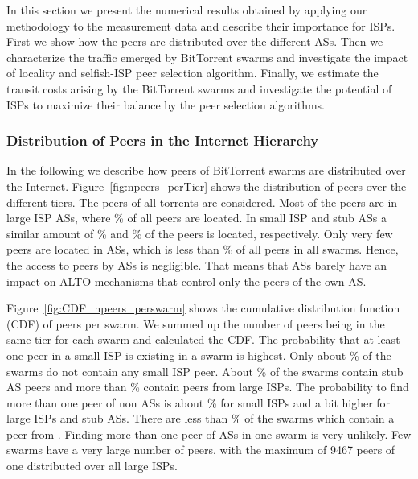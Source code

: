 In this section we present the numerical results obtained by applying our methodology to the measurement data and describe their importance for ISPs. First we show how the peers are distributed over the different ASs. Then we characterize the traffic emerged by BitTorrent swarms and investigate the impact of locality and selfish-ISP peer selection algorithm. Finally, we estimate the transit costs arising by the BitTorrent swarms and investigate the potential of ISPs to maximize their balance by the peer selection algorithms.

\subsubsection{Distribution of Peers in the Internet Hierarchy}

In the following we describe how peers of BitTorrent swarms are distributed over the Internet.
Figure~\ref{fig:npeers_perTier} shows the distribution of peers over the different tiers. The peers of all torrents are considered. Most of the peers are in large ISP ASs, where \unit[40]{\%} of all peers are located. In small ISP and stub ASs a similar amount of \unit[29]{\%} and \unit[31]{\%} of the peers is located, respectively. Only very few peers are located in \tier ASs, which is less than \unit[1]{\%} of all peers in all swarms. Hence, the access to peers by \tier ASs is negligible. That means that \tier ASs barely have an impact on ALTO mechanisms that control only the peers of the own AS.

Figure~\ref{fig:CDF_npeers_perswarm} shows the cumulative distribution function (CDF) of peers per swarm. We summed up the number of peers being in the same tier for each swarm and calculated the CDF. The probability that at least one peer in a small ISP is existing in a swarm is highest. Only about \unit[2]{\%} of the swarms do not contain any small ISP peer. About \unit[57]{\%} of the swarms contain stub AS peers and more than \unit[60]{\%} contain peers from large ISPs. The probability to find more than one peer of non \tier ASs is about \unit[45]{\%} for small ISPs and a bit higher for large ISPs and stub ASs. There are less than \unit[10]{\%} of the swarms which contain a peer from \tier. Finding more than one peer of \tier ASs in one swarm is very unlikely. Few swarms have a very large number of peers, with the maximum of 9467 peers of one distributed over all large ISPs.


